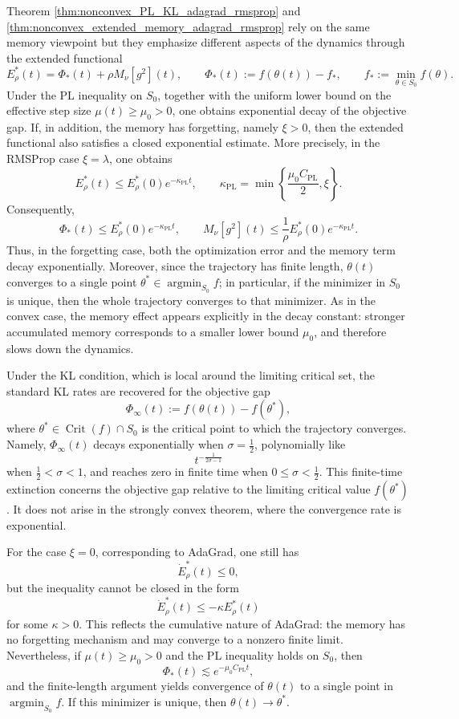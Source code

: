 \documentclass{article} %
\begin{document}
Theorem \ref{thm:nonconvex_PL_KL_adagrad_rmsprop} and \ref{thm:nonconvex_extended_memory_adagrad_rmsprop} rely on the same memory viewpoint but they emphasize different aspects of the dynamics through the extended functional
\[
    E_\rho^*(t)
    =
    \Phi_*(t)+\rho M_\nu[g^2](t),
    \qquad
    \Phi_*(t):=f(\theta(t))-f_*,
    \qquad
    f_*:=\min_{\theta\in S_0}f(\theta).
\]
Under the PL inequality on \(S_0\), together with the uniform lower bound on the effective step size $\mu(t)\geq \mu_0>0$, one obtains exponential decay of the objective gap. If, in addition, the memory has forgetting, namely \(\xi>0\), then the extended functional also satisfies a closed exponential estimate. More precisely, in the RMSProp case \(\xi=\lambda\), one obtains
\[
    E_\rho^*(t)\leq E_\rho^*(0)e^{-\kappa_{\mathrm{PL}}t},
    \qquad
    \kappa_{\mathrm{PL}}
    =
    \min\left\{
        \frac{\mu_0 C_{\mathrm{PL}}}{2},
        \xi
    \right\}.
\]
Consequently,
\[
    \Phi_*(t)\leq E_\rho^*(0)e^{-\kappa_{\mathrm{PL}}t},
    \qquad
    M_\nu[g^2](t)
    \leq
    \frac{1}{\rho}E_\rho^*(0)e^{-\kappa_{\mathrm{PL}}t}.
\]
Thus, in the forgetting case, both the optimization error and the memory term decay exponentially. Moreover, since the trajectory has finite length, \(\theta(t)\) converges to a single point \(\theta^*\in\operatorname{argmin}_{S_0}f\); in particular, if the minimizer in \(S_0\) is unique, then the whole trajectory converges to that minimizer. As in the convex case, the memory effect appears explicitly in the decay constant: stronger accumulated memory corresponds to a smaller lower bound \(\mu_0\), and therefore slows down the dynamics.

Under the KL condition, which is local around the limiting critical set, the standard KL rates are recovered for the objective gap
\[
    \Phi_\infty(t):=f(\theta(t))-f(\theta^*),
\]
where \(\theta^*\in\operatorname{Crit}(f)\cap S_0\) is the critical point to which the trajectory converges. Namely, \(\Phi_\infty(t)\) decays exponentially when \(\sigma=\tfrac12\), polynomially like
\[
    t^{-\frac{1}{2\sigma-1}}
\]
when \(\tfrac12<\sigma<1\), and reaches zero in finite time when \(0\leq\sigma<\tfrac12\). This finite-time extinction concerns the objective gap relative to the limiting critical value \(f(\theta^*)\). It does not arise in the strongly convex theorem, where the convergence rate is exponential.

For the case \(\xi=0\), corresponding to AdaGrad, one still has
\[
    \dot E_\rho^*(t)\leq0,
\]
but the inequality cannot be closed in the form
\[
    \dot E_\rho^*(t)\leq -\kappa E_\rho^*(t)
\]
for some \(\kappa>0\). This reflects the cumulative nature of AdaGrad: the memory has no forgetting mechanism and may converge to a nonzero finite limit. Nevertheless, if \(\mu(t)\geq\mu_0>0\) and the PL inequality holds on \(S_0\), then
\[
    \Phi_*(t)\lesssim e^{-\mu_0 C_{\mathrm{PL}}t},
\]
and the finite-length argument yields convergence of \(\theta(t)\) to a single point in \(\operatorname{argmin}_{S_0}f\). If this minimizer is unique, then \(\theta(t)\to\theta^*\).
\end{document}
